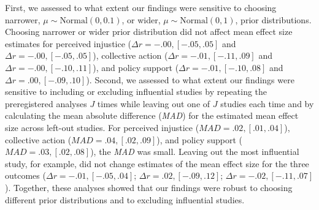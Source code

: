 \documentclass[
]{article}
\begin{document}
First, we assessed to what extent our findings were sensitive to
choosing narrower, \(\mu \sim \text{Normal}(0, 0.1)\), or wider,
\(\mu \sim \text{Normal}(0, 1)\), prior distributions. Choosing narrower
or wider prior distribution did not affect mean effect size estimates
for perceived injustice (\(\Delta r = -.00, [-.05, .05]\) and
\(\Delta r = -.00, [-.05, .05]\)), collective action
(\(\Delta r = -.01, [-.11, .09]\) and \(\Delta r = -.00, [-.10, .11]\)),
and policy support (\(\Delta r = -.01, [-.10, .08]\) and
\(\Delta r = .00, [-.09, .10]\)). Second, we assessed to what extent our
findings were sensitive to including or excluding influential studies by
repeating the preregistered analyses \(J\) times while leaving out one
of \(J\) studies each time and by calculating the mean absolute
difference (\emph{MAD}) for the estimated mean effect size across
left-out studies. For perceived injustice
(\(\textit{MAD} = .02, [.01, .04]\)), collective action
(\(\textit{MAD} = .04, [.02, .09]\)), and policy support
(\(\textit{MAD} = .03, [.02, .08]\)), the \emph{MAD} was small. Leaving
out the most influential study, for example, did not change estimates of
the mean effect size for the three outcomes
(\(\Delta r = -.01, [-.05, .04]\); \(\Delta r = .02, [-.09, .12]\);
\(\Delta r = -.02, [-.11, .07]\)). Together, these analyses showed that
our findings were robust to choosing different prior distributions and
to excluding influential studies.
\end{document}
